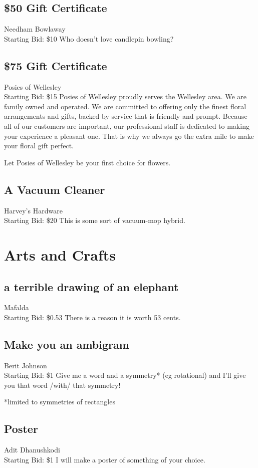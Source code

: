 \documentclass[11pt]{article}
\begin{document}
\subsection{\$50 Gift Certificate}
Needham Bowlaway
\\
Starting Bid: \$10
\newline
Who doesn't love candlepin bowling?
\subsection{\$75 Gift Certificate}
Posies of Wellesley
\\
Starting Bid: \$15
\newline
Posies of Wellesley proudly serves the Wellesley area. We are family owned and operated. We are committed to offering only the finest floral arrangements and gifts, backed by service that is friendly and prompt. Because all of our customers are important, our professional staff is dedicated to making your experience a pleasant one. That is why we always go the extra mile to make your floral gift perfect.

Let Posies of Wellesley be your first choice for flowers.
\subsection{A Vacuum Cleaner}
Harvey's Hardware
\\
Starting Bid: \$20
\newline
This is some sort of vacuum-mop hybrid.
\section{Arts and Crafts}
\subsection{a terrible drawing of an elephant}
Mafalda
\\
Starting Bid: \$0.53
\newline
There is a reason it is worth 53 cents.
\subsection{Make you an ambigram}
Berit Johnson
\\
Starting Bid: \$1
\newline
Give me a word and a symmetry* (eg rotational) and I'll give you that word /with/ that symmetry!

*limited to symmetries of rectangles
\subsection{Poster}
Adit Dhanushkodi
\\
Starting Bid: \$1
\newline
I will make a poster of something of your choice.
\end{document}
